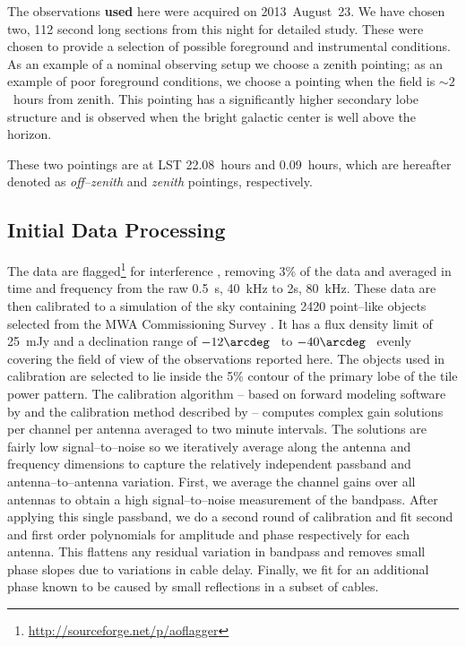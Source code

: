 \documentclass[preprint2,iop,numberedappendix]{emulateapj}
\begin{document}
The observations {\bf used} here were acquired on 2013~August~23. We have chosen two, 112 second long sections from this night for detailed study. These were chosen to provide a selection of possible foreground and instrumental conditions. As an example of a nominal observing setup we choose a zenith pointing; as an example of poor foreground conditions, we choose a pointing when the field is $\sim 2$~hours from zenith. This pointing has a significantly higher secondary lobe structure and is observed when the bright galactic center is well above the horizon. 

These two pointings are at LST 22.08~hours and 0.09~hours, which are hereafter denoted as {\it off--zenith} and {\it zenith} pointings, respectively. 

\subsection{Initial Data Processing}\label{sec:data-analysis}

The data are flagged\footnote{\url{http://sourceforge.net/p/aoflagger}} for interference \citep{off10,off12}, removing 3\% of the data and averaged in time  and frequency from the raw 0.5~s, 40~kHz to 2s, 80~kHz. These data are then calibrated to a simulation of the sky containing 2420 point--like objects selected from the MWA Commissioning Survey \citep[MWACS;][]{hur14}. It has a flux density limit of 25~mJy and a declination range of $-12\arcdeg$~ to $-40\arcdeg$~ evenly covering the field of view of the observations reported here. The objects used in calibration are selected to lie inside the 5\% contour of the primary lobe of the tile power pattern. The calibration algorithm -- based on forward modeling software by \citet{sul12} and the calibration method described by \citet{sal14} -- computes complex gain solutions per channel per antenna averaged to two minute intervals. The solutions are fairly low signal--to--noise so we iteratively average along the antenna and frequency dimensions to capture the relatively independent passband and antenna--to--antenna variation. First, we average the channel gains over all antennas to obtain a high signal--to--noise measurement of the bandpass. After applying this single passband, we do a second round of calibration and fit second and first order polynomials for amplitude and phase respectively for each antenna. This flattens any residual variation in bandpass and removes small phase slopes due to variations in cable delay. Finally, we fit for an additional phase known to be caused by small reflections in a subset of cables. 
\end{document}

